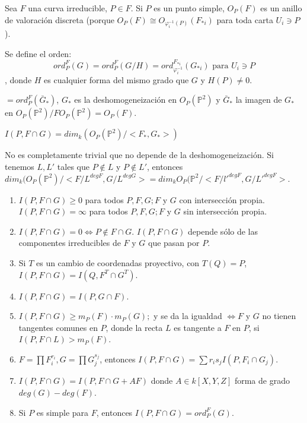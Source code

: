 \vspace{5mm}


Sea $F$ una curva irreducible, $P\in F$. Si $P$ es un punto simple, $O_P(F)$ es un anillo de valoración discreta (porque $O_P(F) \cong O_{\varphi_i^{-1}(P)}(F_{*i})$ para toda carta $U_i \ni P$). 


\vspace{5mm}

Se define el orden: 
$$ord_P^F(G)= ord_P^F(G/H)=ord_{\varphi_i^{-1}}^{F_{*i}}(G_{*i}) \text{ para } U_i\ni P$$
, donde $H$ es cualquier forma del mismo grado que $G$ y $H(P)\neq 0$. 

$= ord_P^F(\bar{G}_*)$, $G_*$ es la deshomogeneización en $O_P(\mathbb{P}^2)$ y $\bar{G}_*$ la imagen de $G_*$ en $O_P(\mathbb{P}^2)/FO_P(\mathbb{P}^2)=O_P(F)$. 

\begin{Def}
$I(P,F\cap G)=dim_k(O_P(\mathbb{P}^2)/<F_*,G_*>)$
\end{Def}

\begin{nota}
No es completamente trivial que no depende de la deshomogeneización. Si tenemos $L,L'$ tales que $P\notin L$ y $P\notin L'$, entonces 
$dim_k(O_P(\mathbb{P}^2)/<F/L^{degF},G/L^{degG}>=dim_k O_P(\mathbb{P}^2/<F/l'^{degF},G/L'^{degF}>$. 
\end{nota}

\begin{Cor}
\begin{enumerate}
\item $I(P,F\cap G) \ge 0$ para todos $P,F,G; F$ y $G$ con intersección propia. $I(P,F\cap G)=\infty$ para todos $P,F,G; F$ y $G$ sin intersección propia. 
\item $I(P,F\cap G)=0  \Leftrightarrow P\notin F\cap G$. $I(P,F\cap G)$ depende sólo de las componentes irreducibles de $F$ y $G$ que pasan por $P$. 
\item Si $T$ es un cambio de coordenadas proyectivo, con $T(Q)=P$, $I(P,F\cap G)=I(Q,F^T\cap G^T)$. 
\item $I(P,F\cap G)=I(P,G\cap F)$. 
\item $I(P,F\cap G)\ge m_P(F)\cdot m_P(G);$ y se da la igualdad $\Leftrightarrow F$ y $G$ no tienen tangentes comunes en $P$, donde la recta $L$ es tangente a $F$ en $P$, si $I(P,F\cap L)>m_P(F)$. 
\item $F=\prod F_i^{r_i}, G=\prod G_j^{s_j}$, entonces $I(P,F\cap G)=\sum r_i s_j I(P,F_i\cap G_j)$. 
\item $I(P,F\cap G)=I(P,F\cap G+AF)$ donde $A\in k[X,Y,Z]$ forma de grado $deg(G)-deg(F)$.
\item Si $P$ es simple para $F$, entonces $I(P,F\cap G)=ord_P^F(G)$.
\end{enumerate}
\end{Cor}

